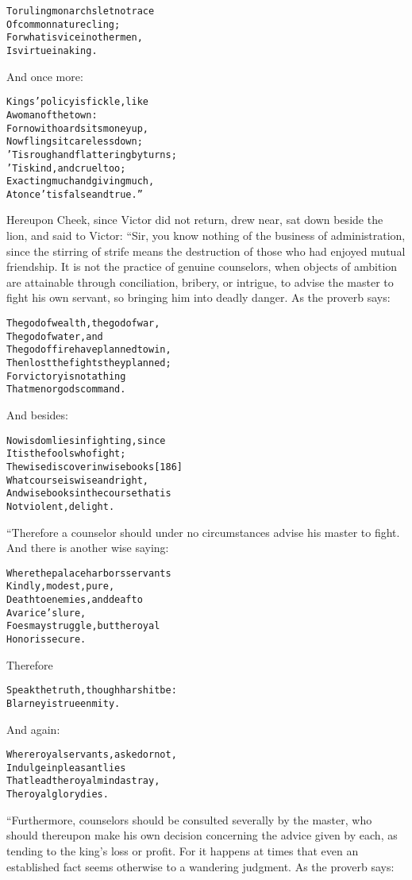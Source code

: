\documentclass{article}
\renewenvironment{verbatim}{\begin{alltt}\normalfont\begin{centering}}{\end{centering}\end{alltt}}
\begin{document}
\begin{verbatim}
To ruling monarchs let no trace
    Of common nature cling;
For what is vice in other men,
    Is virtue in a king.
\end{verbatim}
And once more:

\begin{verbatim}
Kings' policy is fickle, like
    A woman of the town:
For now it hoards its money up,
    Now flings it careless down;
'Tis rough and flattering by turns;
    'Tis kind, and cruel too;
Exacting much and giving much,
    At once 'tis false and true.”
\end{verbatim}
Hereupon Cheek, since Victor did not return, drew near, sat down
beside the lion, and said to Victor: “Sir, you know nothing of the
business of administration, since the stirring of strife means the
destruction of those who had enjoyed mutual friendship. It is not
the practice of genuine counselors, when objects of ambition are
attainable through conciliation, bribery, or intrigue, to advise
the master to fight his own servant, so bringing him into deadly
danger. As the proverb says:

\begin{verbatim}
The god of wealth, the god of war,
    The god of water, and
The god of fire have planned to win,
    Then lost the fights they planned;
For victory is not a thing
    That men or gods command.
\end{verbatim}
And besides:

\begin{verbatim}
No wisdom lies in fighting, since
    It is the fools who fight;
The wise discover in wise books                         [186]
    What course is wise and right,
And wise books in the course that is
    Not violent, delight.
\end{verbatim}
“Therefore a counselor should under no circumstances advise his
master to fight. And there is another wise saying:

\begin{verbatim}
Where the palace harbors servants
    Kindly, modest, pure,
Death to enemies, and deaf to
    Avarice's lure,
Foes may struggle, but the royal
    Honor is secure.
\end{verbatim}
Therefore

\begin{verbatim}
Speak the truth, though harsh it be:
Blarney is true enmity.
\end{verbatim}
And again:

\begin{verbatim}
Where royal servants, asked or not,
    Indulge in pleasant lies
That lead the royal mind astray,
    The royal glory dies.
\end{verbatim}
“Furthermore, counselors should be consulted severally by the
master, who should thereupon make his own decision concerning the
advice given by each, as tending to the king's loss or profit. For
it happens at times that even an established fact seems otherwise
to a wandering judgment. As the proverb says:
\end{document}
